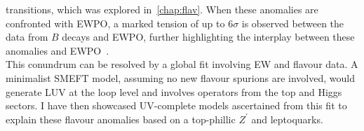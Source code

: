 transitions, which was explored in~\autoref{chap:flav}. When these anomalies are confronted with EWPO, a marked tension of up to $ 6\sigma$ is observed between the data from $B$ decays and EWPO, further highlighting the interplay between these anomalies and EWPO~\cite{Bhattacharya:2014wla,Feruglio:2016gvd,Celis:2017doq,Buttazzo:2017ixm, Kumar:2018kmr,Ciuchini:2019usw,Aebischer:2019mlg,Cornella:2019hct}.\\ This conundrum can be resolved by a global fit involving EW and flavour data. A minimalist SMEFT model, assuming no new flavour spurions are involved, would generate LUV at the loop level and involves operators from the top and Higgs sectors. I have then showcased UV-complete models ascertained from this fit to explain these flavour anomalies based on a top-phillic $Z^\prime$ and leptoquarks.